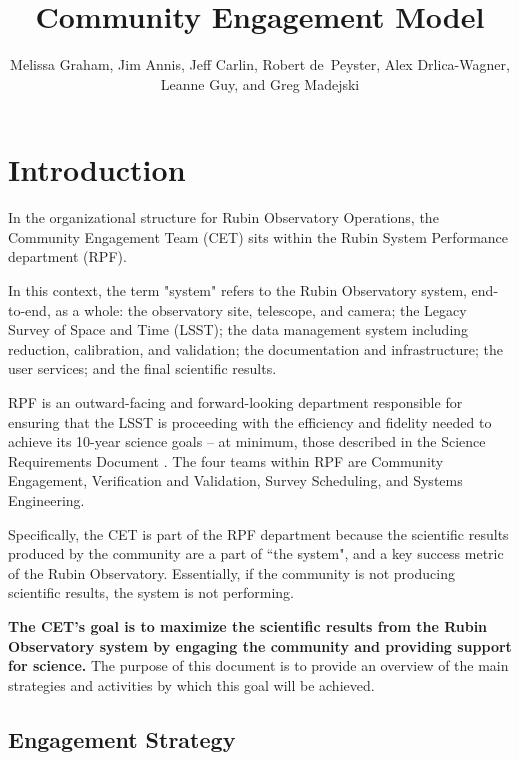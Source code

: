 \documentclass[DM,lsstdraft,toc]{lsstdoc}
\title{Community Engagement Model}
\author{%
Melissa Graham, Jim Annis, Jeff Carlin, Robert de~Peyster, Alex Drlica-Wagner, Leanne Guy, and Greg Madejski
}
\date{\vcsDate}
\begin{document}
\maketitle



\section{Introduction}\label{sec:intro}

In the organizational structure for Rubin Observatory Operations, the Community Engagement Team (CET) sits within the Rubin System Performance department (RPF).

In this context, the term "system" refers to the Rubin Observatory system, end-to-end, as a whole: the observatory site, telescope, and camera; the Legacy Survey of Space and Time (LSST); the data management system including reduction, calibration, and validation; the documentation and infrastructure; the user services; and the final scientific results.

RPF is an outward-facing and forward-looking department responsible for ensuring that the LSST is proceeding with the efficiency and fidelity needed to achieve its 10-year science goals -- at minimum, those described in the Science Requirements Document .
The four teams within RPF are Community Engagement, Verification and Validation, Survey Scheduling, and Systems Engineering.

Specifically, the CET is part of the RPF department because the scientific results produced by the community are a part of ``the system", and a key success metric of the Rubin Observatory.
Essentially, if the community is not producing scientific results, the system is not performing. 

\textbf{The CET's goal is to maximize the scientific results from the Rubin Observatory system by engaging the community and providing support for science.}
The purpose of this document is to provide an overview of the main strategies and activities by which this goal will be achieved.


\subsection{Engagement Strategy}\label{ssec:intro_strat}
\end{document}
